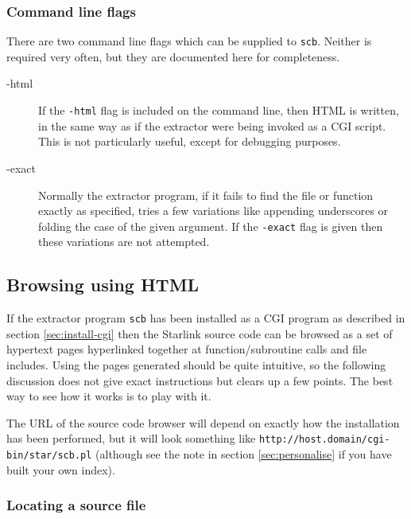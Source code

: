 \documentclass[twoside,11pt]{article}
\newcommand{\xlabel}[1]{}
\renewcommand{\_}{\texttt{\symbol{95}}}
\begin{document}
\subsubsection{\xlabel{sec:extract-flags}\label{sec:extract-flags}Command line flags}

There are two command line flags which can be supplied to {\tt scb}.
Neither is required very often, but they are documented here for completeness.
\begin{description}
\item[-html]
If the {\tt -html} flag is included on the command line, 
then HTML is written, in the same way as if the extractor were
being invoked as a CGI script.  This is not particularly useful,
except for debugging purposes.
\item[-exact]
Normally the extractor program, if it fails to find the file or
function exactly as specified, tries a few variations like appending
underscores or folding the case of the given argument.
If the {\tt -exact} flag is given then these variations are not attempted.
\end{description}




\subsection{\xlabel{sec:extract-cgi}\label{sec:extract-cgi}Browsing using HTML}

If the extractor program {\tt scb} has been installed
as a CGI program as described in section \ref{sec:install-cgi}
then the Starlink source code can be browsed as a set of 
hypertext pages hyperlinked together 
at function/subroutine calls and file includes.
Using the pages generated should be quite intuitive,
so the following discussion does not give exact instructions
but clears up a few points.
The best way to see how it works is to play with it.

The URL of the source code browser will depend on exactly how
the installation has been performed, but it will look something
like {\tt http://host.domain/cgi-bin/star/scb.pl} 
(although see the note in section \ref{sec:personalise} 
if you have built your own index).


\subsubsection{\xlabel{BROWSER-HELP}\label{BROWSER-HELP}Locating a source file}
\end{document}
